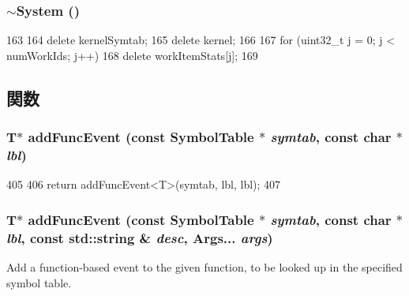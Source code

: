 \hypertarget{classSystem_a3bfbca0e3ddd7ea1f8709c986454d753}{
\subsubsection[{$\sim$System}]{\setlength{\rightskip}{0pt plus 5cm}$\sim${\bf System} ()}}
\label{classSystem_a3bfbca0e3ddd7ea1f8709c986454d753}



\begin{DoxyCode}
163 {
164     delete kernelSymtab;
165     delete kernel;
166 
167     for (uint32_t j = 0; j < numWorkIds; j++)
168         delete workItemStats[j];
169 }
\end{DoxyCode}


\subsection{関数}
\hypertarget{classSystem_a651f66880621119f2d0ab293788c01c4}{
\subsubsection[{addFuncEvent}]{\setlength{\rightskip}{0pt plus 5cm}T$\ast$ addFuncEvent (const {\bf SymbolTable} $\ast$ {\em symtab}, \/  const char $\ast$ {\em lbl})}}
\label{classSystem_a651f66880621119f2d0ab293788c01c4}



\begin{DoxyCode}
405     {
406         return addFuncEvent<T>(symtab, lbl, lbl);
407     }
\end{DoxyCode}
\hypertarget{classSystem_a35e24b9d75d9b23f195b383672965a24}{
\subsubsection[{addFuncEvent}]{\setlength{\rightskip}{0pt plus 5cm}T$\ast$ addFuncEvent (const {\bf SymbolTable} $\ast$ {\em symtab}, \/  const char $\ast$ {\em lbl}, \/  const std::string \& {\em desc}, \/  Args... {\em args})}}
\label{classSystem_a35e24b9d75d9b23f195b383672965a24}
Add a function-\/based event to the given function, to be looked up in the specified symbol table.

